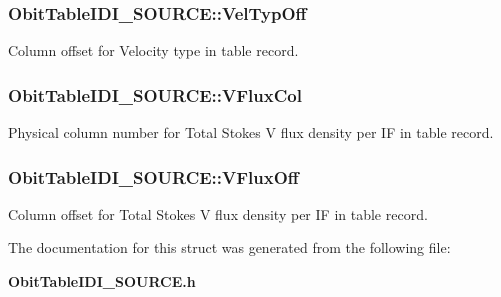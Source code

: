 \subsubsection{ {\bf Obit\-Table\-IDI\_\-SOURCE::Vel\-Typ\-Off}}\label{structObitTableIDI__SOURCE_o66}


Column offset for Velocity type in table record. 

\subsubsection{ {\bf Obit\-Table\-IDI\_\-SOURCE::VFlux\-Col}}\label{structObitTableIDI__SOURCE_o59}


Physical column number for Total Stokes V flux density per IF in table record. 

\subsubsection{ {\bf Obit\-Table\-IDI\_\-SOURCE::VFlux\-Off}}\label{structObitTableIDI__SOURCE_o58}


Column offset for Total Stokes V flux density per IF in table record. 



The documentation for this struct was generated from the following file:\begin{CompactItemize}
\item 
{\bf Obit\-Table\-IDI\_\-SOURCE.h}\end{CompactItemize}
